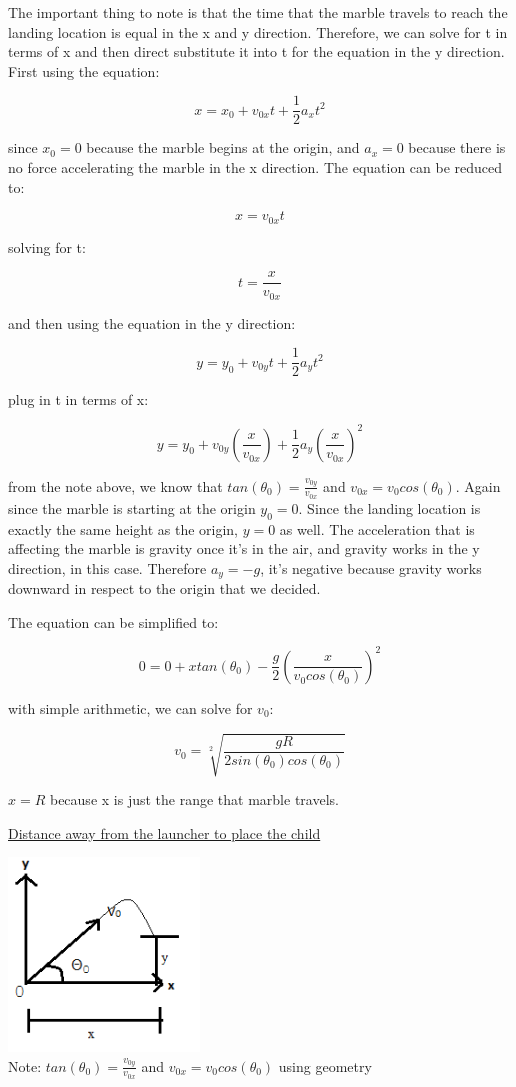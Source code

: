\documentclass[aps,letterpaper,11pt]{revtex4}
\begin{document}
The important thing to note is that the time that the marble travels to reach the landing location is equal in the x and y direction. Therefore, we can solve for t in terms of x and then direct substitute it into t for the equation in the y direction. First using the equation:

\[ x = x_0+v_{0x}t+\frac{1}{2}a_xt^2\]

since $x_0=0$ because the marble begins at the origin, and $a_x=0$ because there is no force accelerating the marble in the x direction. The equation can be reduced to:

$$ x=v_{0x}t$$

solving for t:

$$ t=\frac{x}{v_{0x}}$$

and then using the equation in the y direction:

\[ y = y_0+v_{0y}t+\frac{1}{2}a_yt^2\]

plug in t in terms of x:

\[ y = y_0+v_{0y}(\frac{x}{v_{0x}})+\frac{1}{2}a_y(\frac{x}{v_{0x}})^2\]

from the note above, we know that $tan(\theta_0) = \frac{v_{0y}}{v_{0x}}$ and $v_{0x}=v_0cos(\theta_0)$. Again since the marble is starting at the origin $y_0=0$. Since the landing location is exactly the same height as the origin, $y=0$ as well. The acceleration that is affecting the marble is gravity once it's in the air, and gravity works in the y direction, in this case. Therefore $a_y=-g$, it's negative because gravity works downward in respect to the origin that we decided. 

The equation can be simplified to:

\[ 0=0+xtan(\theta_0)-\frac{g}{2}(\frac{x}{v_0cos(\theta_0)})^2\]

with simple arithmetic, we can solve for $v_0$:

\[ \boxed{v_0=\sqrt[2]{\frac{gR}{2sin(\theta_0)cos(\theta_0)}}}\]

$x=R$ because x is just the range that marble travels.

\underline{Distance away from the launcher to place the child}

\begin{center}
\includegraphics[width=2in]{FINALCALC.png}\\
Note: $tan(\theta_0) = \frac{v_{0y}}{v_{0x}}$ and $v_{0x}=v_0cos(\theta_0)$ using geometry
\end{center}
\end{document}
